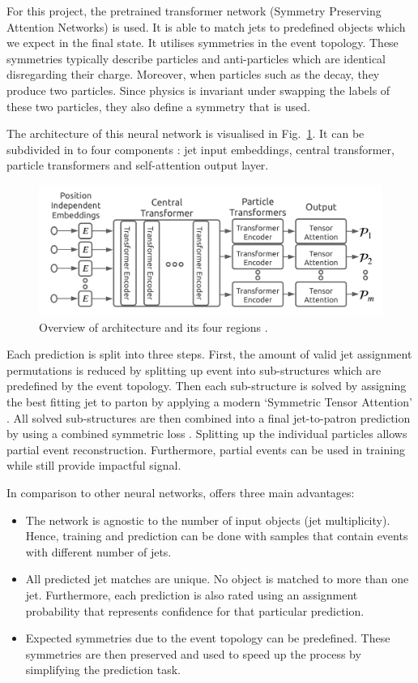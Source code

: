 \documentclass[bachelor,ngerman,english]{GAUBM}
\begin{document}
For this project, the pretrained transformer network \spanet (Symmetry Preserving Attention Networks) \cite{spanet} is used. It is able to match jets to predefined objects which we expect in the final state. It utilises symmetries in the event topology. These symmetries typically describe particles and anti-particles which are identical disregarding their charge. Moreover, when particles such as the \wboson decay, they produce two particles. Since physics is invariant under swapping the labels of these two particles, they also define a symmetry that is used. 

The architecture of this neural network is visualised in Fig.~\ref{fig:spanet}. It can be subdivided in to four components \cite{spanet}: jet input embeddings, central transformer, particle transformers and self-attention output layer.

\begin{figure}[t]
    \centering
    \includegraphics[width=.85\textwidth]{figures/methods/spanet.png}
    \caption{Overview of \spanets architecture and its four regions \cite{spanet}.}
    \label{fig:spanet}
\end{figure}

Each prediction is split into three steps. First, the amount of valid jet assignment permutations is reduced by splitting up event into sub-structures which are predefined by the event topology. Then each sub-structure is solved by assigning the best fitting jet to parton by applying a modern `Symmetric Tensor Attention' \cite{spanet}. All solved sub-structures are then combined into a final jet-to-patron prediction by using a combined symmetric loss \cite{spanet}. Splitting up the individual particles allows partial event reconstruction. Furthermore, partial events can be used in training while still provide impactful signal.

In comparison to other neural networks, \spanet offers three main advantages: \cite{spanet}

\begin{itemize}
    \item The network is agnostic to the number of input objects (jet multiplicity). Hence, training and prediction can be done with samples that contain events with different number of jets.
    \item All predicted jet matches are unique. No object is matched to more than one jet. Furthermore, each prediction is also rated using an assignment probability that represents \spanets confidence for that particular prediction.
    \item Expected symmetries due to the event topology can be predefined. These symmetries are then preserved and used to speed up the process by simplifying the prediction task. 
\end{itemize}
\end{document}
